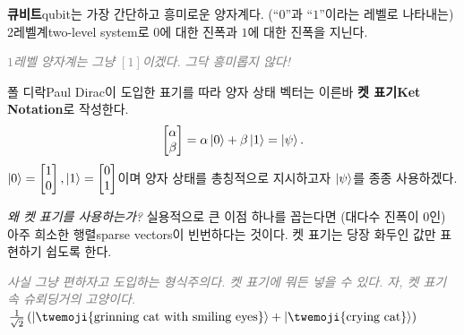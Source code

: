 \documentclass[a4paper,chapter,atbegshi,]{oblivoir}
\begin{document}
\hfill\break

\textbf{큐비트}{\footnotesize qubit}는 가장 간단하고 흥미로운 양자계다.
(``$0$''과 ``$1$''이라는 레벨로 나타내는) 2레벨계{\footnotesize two-level
system}로 $0$에 대한 진폭과 $1$에 대한 진폭을 지닌다.

\hfill

\hfill\parbox[t]{9cm}{\itshape\textcolor{gray}{$1$레벨 양자계는 그냥 $[1]$이겠다.
그닥 흥미롭지 않다!}}

\hfill

폴 디락{\footnotesize Paul Dirac}이 도입한 표기를 따라 양자 상태 벡터는
이른바 \textbf{켓 표기{\footnotesize Ket Notation}}로 작성한다. 
\[
  \begin{bmatrix}\alpha\\\beta\end{bmatrix} 
  = \alpha\ket{0}+\beta\ket{1}=\ket{\psi}.
\]
$\ket0=\begin{bmatrix}1\\0\end{bmatrix}, \ket1=\begin{bmatrix}0\\1
\end{bmatrix}$이며 양자 상태를 총칭적으로 지시하고자 $\ket{\psi}$를 종종
사용하겠다.

\emph{왜 켓 표기를 사용하는가?} 실용적으로 큰 이점 하나를 꼽는다면 (대다수 진폭이
$0$인) 아주 희소한 행렬{\footnotesize sparse vectors}이 빈번하다는 것이다.
켓 표기는 당장 화두인 값만 표현하기 쉽도록 한다.

\hfill

\hfill\parbox[t]{9cm}{\itshape\textcolor{gray}{사실 그냥 편하자고 도입하는
형식주의다. 켓 표기에 뭐든 넣을 수 있다. 자, 켓 표기 속 슈뢰딩거의 고양이다.
$\frac{1}{\sqrt2}\left(\ket{\textrm{\twemoji{grinning cat with smiling eyes}}}
+\ket{\textrm{\twemoji{crying cat}}}\right)$}}
\end{document}
